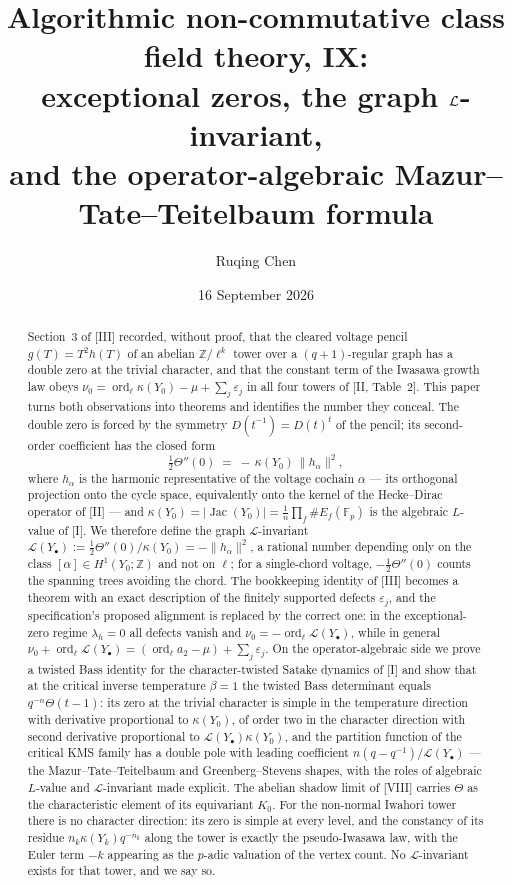 \documentclass[11pt]{amsart}
\title[Algorithmic non-commutative class field theory, IX]
{Algorithmic non-commutative class field theory, IX:\\
exceptional zeros, the graph $\cL$-invariant,\\ and the operator-algebraic
Mazur--Tate--Teitelbaum formula}
\author{Ruqing Chen}
\date{16 September 2026}
\numberwithin{equation}{section}
\theoremstyle{definition}
\theoremstyle{remark}
\newcommand{\Z}{\mathbb{Z}}
\newcommand{\F}{\mathbb{F}}
\newcommand{\cL}{\mathcal{L}}
\newcommand{\Jac}{\operatorname{Jac}}
\newcommand{\ord}{\operatorname{ord}}
\begin{document}
\begin{abstract}
Section~3 of [III] recorded, without proof, that the cleared voltage pencil
$g(T)=T^{2}h(T)$ of an abelian $\Z/\ell^{k}$ tower over a $(q{+}1)$-regular graph has a
double zero at the trivial character, and that the constant term of the Iwasawa growth
law obeys $\nu_0=\ord_\ell\kappa(Y_0)-\mu+\sum_j\varepsilon_j$ in all four towers of
[II, Table~2]. This paper turns both observations into theorems and identifies the
number they conceal. The double zero is forced by the symmetry $D(t^{-1})=D(t)^{t}$ of
the pencil; its second-order coefficient has the closed form
\[
\tfrac12\Theta''(0)\;=\;-\,\kappa(Y_0)\,\|h_\alpha\|^{2},
\]
where $h_\alpha$ is the harmonic representative of the voltage cochain $\alpha$ --- its
orthogonal projection onto the cycle space, equivalently onto the kernel of the
Hecke--Dirac operator of [II] --- and $\kappa(Y_0)=|\Jac(Y_0)|=\frac1n\prod_f\#E_f(\F_p)$
is the algebraic $L$-value of [I]. We therefore define the graph $\cL$-invariant
$\cL(Y_\bullet):=\tfrac12\Theta''(0)/\kappa(Y_0)=-\|h_\alpha\|^{2}$, a rational number
depending only on the class $[\alpha]\in H^{1}(Y_0;\Z)$ and not on $\ell$; for a
single-chord voltage, $-\tfrac12\Theta''(0)$ counts the spanning trees avoiding the
chord. The bookkeeping identity of [III] becomes a theorem with an exact description of
the finitely supported defects $\varepsilon_j$, and the specification's proposed
alignment is replaced by the correct one: in the exceptional-zero regime $\lambda_h=0$
all defects vanish and $\nu_0=-\ord_\ell\cL(Y_\bullet)$, while in general
$\nu_0+\ord_\ell\cL(Y_\bullet)=(\ord_\ell a_2-\mu)+\sum_j\varepsilon_j$. On the
operator-algebraic side we prove a twisted Bass identity for the character-twisted
Satake dynamics of [I] and show that at the critical inverse temperature $\beta=1$ the
twisted Bass determinant equals $q^{-n}\Theta(t-1)$: its zero at the trivial character
is simple in the temperature direction with derivative proportional to $\kappa(Y_0)$,
of order two in the character direction with second derivative proportional to
$\cL(Y_\bullet)\kappa(Y_0)$, and the partition function of the critical KMS family has a
double pole with leading coefficient $n(q-q^{-1})/\cL(Y_\bullet)$ --- the
Mazur--Tate--Teitelbaum and Greenberg--Stevens shapes, with the roles of algebraic
$L$-value and $\cL$-invariant made explicit. The abelian shadow limit of [VIII] carries
$\Theta$ as the characteristic element of its equivariant $K_0$. For the non-normal
Iwahori tower there is no character direction: its zero is simple at every level, and
the constancy of its residue $n_k\kappa(Y_k)q^{-n_k}$ along the tower is exactly the
pseudo-Iwasawa law, with the Euler term $-k$ appearing as the $p$-adic valuation of the
vertex count. No $\cL$-invariant exists for that tower, and we say so.
\end{abstract}
\end{document}
